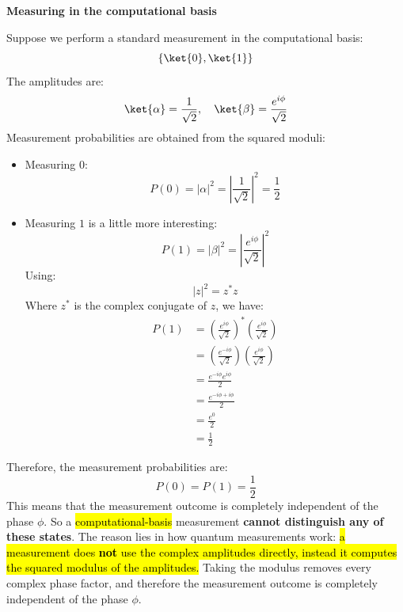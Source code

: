 \highspace
\begin{flushleft}
    \textcolor{Red2}{ \textbf{Measuring in the computational basis}}
\end{flushleft}
Suppose we perform a standard measurement in the computational basis:
\begin{equation*}
    \left\{\ket{0}, \ket{1}\right\}
\end{equation*}
The amplitudes are:
\begin{equation*}
    \ket{\alpha} = \frac{1}{\sqrt{2}}, \quad \ket{\beta} = \frac{e^{i\phi}}{\sqrt{2}}
\end{equation*}
Measurement probabilities are obtained from the squared moduli:
\begin{itemize}
    \item Measuring $0$:
    \begin{equation*}
        P(0) = |\alpha|^2 = \left|\frac{1}{\sqrt{2}}\right|^2 = \frac{1}{2}
    \end{equation*}


    \item Measuring $1$ is a little more interesting:
    \begin{equation*}
        P(1) = |\beta|^2 = \left|\frac{e^{i\phi}}{\sqrt{2}}\right|^2
    \end{equation*}
    Using:
    \begin{equation*}
        \left|z\right|^2 = z^* z
    \end{equation*}
    Where $z^*$ is the complex conjugate of $z$, we have:
    \begin{align*}
        P(1) &= \left(\frac{e^{i\phi}}{\sqrt{2}}\right)^* \left(\frac{e^{i\phi}}{\sqrt{2}}\right) \\[.3em]
        &= \left(\frac{e^{-i\phi}}{\sqrt{2}}\right) \left(\frac{e^{i\phi}}{\sqrt{2}}\right) \\[.3em]
        &= \frac{e^{-i\phi} e^{i\phi}}{2} \\[.3em]
        &= \frac{e^{-i\phi + i\phi}}{2} \\[.3em]
        &= \frac{e^{0}}{2} \\[.3em]
        &= \frac{1}{2}
    \end{align*}
\end{itemize}
Therefore, the measurement probabilities are:
\begin{equation*}
    P(0) = P(1) = \frac{1}{2}
\end{equation*}
This means that the measurement outcome is completely independent of the phase $\phi$. So a \hl{computational-basis} measurement \textbf{cannot distinguish any of these states}. The reason lies in how quantum measurements work: \hl{a measurement does \textbf{not} use the complex amplitudes directly, instead it computes the squared modulus of the amplitudes.} Taking the modulus removes every complex phase factor, and therefore the measurement outcome is completely independent of the phase $\phi$.

